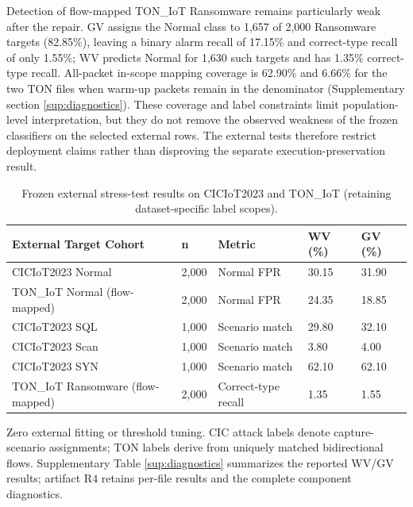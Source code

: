 \documentclass[final,3p,10pt,nopreprintline]{elsarticle}
\begin{document}
Detection of flow-mapped TON\_IoT Ransomware remains particularly weak after the repair. GV assigns the Normal class to 1,657 of 2,000 Ransomware targets (82.85\%), leaving a binary alarm recall of 17.15\% and correct-type recall of only 1.55\%; WV predicts Normal for 1,630 such targets and has 1.35\% correct-type recall. All-packet in-scope mapping coverage is 62.90\% and 6.66\% for the two TON files when warm-up packets remain in the denominator (Supplementary section \ref*{sup:diagnostics}). These coverage and label constraints limit population-level interpretation, but they do not remove the observed weakness of the frozen classifiers on the selected external rows. The external tests therefore restrict deployment claims rather than disproving the separate execution-preservation result.

\begin{table}[H]\centering\small\setlength{\tabcolsep}{3pt}\renewcommand{\arraystretch}{1.13}
\caption{Frozen external stress-test results on CICIoT2023 and TON\_IoT (retaining dataset-specific label scopes).}\label{tab:transfer}
\begin{tabular}{L{0.32\dimexpr{}\tabcolsep\relax}L{0.08\dimexpr{}\tabcolsep\relax}L{0.26\dimexpr{}\tabcolsep\relax}L{0.17\dimexpr{}\tabcolsep\relax}L{0.17\dimexpr{}\tabcolsep\relax}}\toprule
\textbf{External Target Cohort} & \textbf{n} & \textbf{Metric} & \textbf{WV (\%)} & \textbf{GV (\%)}\\\midrule
CICIoT2023 Normal & 2,000 & Normal FPR & 30.15 & 31.90\\
TON\_IoT Normal (flow-mapped) & 2,000 & Normal FPR & 24.35 & 18.85\\
CICIoT2023 SQL & 1,000 & Scenario match & 29.80 & 32.10\\
CICIoT2023 Scan & 1,000 & Scenario match & 3.80 & 4.00\\
CICIoT2023 SYN & 1,000 & Scenario match & 62.10 & 62.10\\
TON\_IoT Ransomware (flow-mapped) & 2,000 & Correct-type recall & 1.35 & 1.55\\
\bottomrule\end{tabular}
\end{table}

Zero external fitting or threshold tuning. CIC attack labels denote capture-scenario assignments; TON labels derive from uniquely matched bidirectional flows. Supplementary Table \ref*{sup:diagnostics} summarizes the reported WV/GV results; artifact R4 retains per-file results and the complete component diagnostics.
\end{document}
